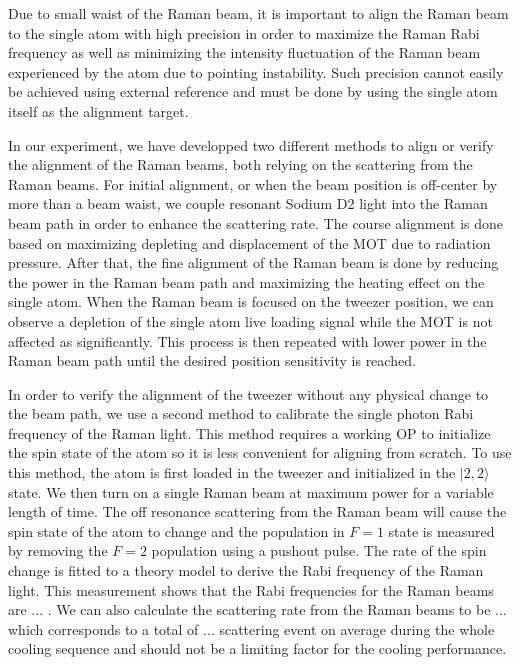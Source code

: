 Due to small waist of the Raman beam, it is important to align the Raman beam to
the single atom with high precision in order to maximize the Raman Rabi frequency
as well as minimizing the intensity fluctuation of the Raman beam experienced by the atom
due to pointing instability.
Such precision cannot easily be achieved using external reference and
must be done by using the single atom itself as the alignment target.

In our experiment, we have developped two different methods to align or verify the alignment
of the Raman beams, both relying on the scattering from the Raman beams.
For initial alignment, or when the beam position is off-center
by more than a beam waist, we couple resonant Sodium D2 light into the Raman beam path
in order to enhance the scattering rate. The course alignment is done based on
maximizing depleting and displacement of the MOT due to radiation pressure.
After that, the fine alignment of the Raman beam is done by reducing the power in the Raman
beam path and maximizing the heating effect on the single atom.
When the Raman beam is focused on the tweezer position,
we can observe a depletion of the single atom live loading signal
while the MOT is not affected as significantly.
This process is then repeated with lower power in the Raman beam path until the desired
position sensitivity is reached.

In order to verify the alignment of the tweezer without any physical change to the beam path,
we use a second method to calibrate the single photon Rabi frequency of the Raman light.
This method requires a working OP to initialize the spin state of the atom
so it is less convenient for aligning from scratch.
To use this method, the atom is first loaded in the tweezer and initialized
in the $|2,2\rangle$ state. We then turn on a single Raman beam at maximum power for a
variable length of time. The off resonance scattering from the Raman beam will cause
the spin state of the atom to change and the population in $F=1$ state is measured
by removing the $F=2$ population using a pushout pulse.
The rate of the spin change is fitted to a theory model to derive the Rabi frequency of
the Raman light. This measurement shows that the Rabi frequencies for the Raman beams are
... . We can also calculate the scattering rate from the Raman
beams to be ...  which corresponds to a total of $...$ 
scattering event on average during the whole cooling sequence and
should not be a limiting factor for the cooling performance.

